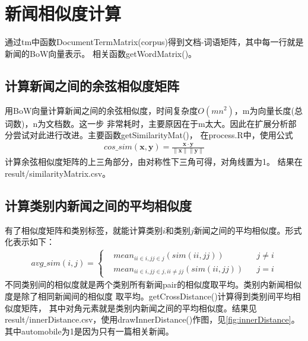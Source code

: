 \documentclass[12pt]{article}
\begin{document}
\section{新闻相似度计算}
通过tm中函数DocumentTermMatrix(corpus)得到文档-词语矩阵，其中每一行就是新闻的BoW向量表示。
相关函数getWordMatrix()。
\subsection{计算新闻之间的余弦相似度矩阵}
用BoW向量计算新闻之间的余弦相似度，时间复杂度$O(mn^2)$，m为向量长度(总词数)，n为文档数。这一步
非常耗时，主要原因在于m太大。因此在扩展分析部分尝试对此进行改进。主要函数getSimilarityMat()，
在process.R中，使用公式
\begin{eqnarray*}
  cos\_sim(\mathbf{x},\mathbf{y})=
  \frac{\mathbf{x}\cdot \mathbf{y}}
  {\lVert \mathbf{x} \rVert \lVert \mathbf{y} \rVert}
\end{eqnarray*}
计算余弦相似度矩阵的上三角部分，由对称性下三角可得，对角线置为1。
结果在result/similarityMatrix.csv。
\subsection{计算类别内新闻之间的平均相似度}
有了相似度矩阵和类别标签，就能计算类别$i$和类别$j$新闻之间的平均相似度。形式化表示如下：
\begin{eqnarray*}
  avg\_sim(i,j) = \left\{
                  \begin{aligned}
                  &mean_{ii\in i,jj\in j}(sim(ii,jj)) &  & j\neq i \\
                  &mean_{ii\in i,jj\in j,ii\neq jj}(sim(ii,jj)) &  & j=i 
                  \end{aligned}
                  \right.
\end{eqnarray*}
不同类别间的相似度就是两个类别所有新闻pair的相似度取平均。类别内新闻相似度是除了相同新闻间的相似度
取平均。getCrossDistance()计算得到类别间平均相似度矩阵，
其中对角元素就是类别内新闻之间的平均相似度。结果见
result/innerDistance.csv，使用drawInnerDistance()作图，见\ref{fig:innerDistance}。
其中automobile为1是因为只有一篇相关新闻。
\end{document}
